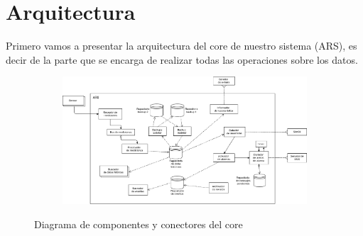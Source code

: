 \section{Arquitectura}
Primero vamos a presentar la arquitectura del core de nuestro sistema (ARS), es decir de la parte que se encarga de realizar todas las operaciones sobre los datos.

\begin{figure}[h]
  \begin{subfigure}{.5\textwidth}
    \includegraphics[width=\textwidth]{imagenes/diagramas/core.png}
  \end{subfigure}
  \label{}
  \caption{Diagrama de componentes y conectores del core}
\end{figure}

